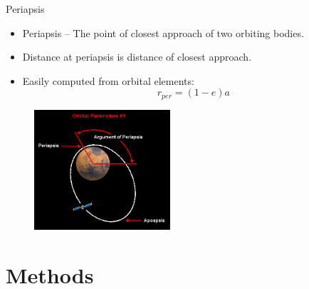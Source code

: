 \documentclass{beamer}
\begin{document}
\begin{frame}{Periapsis}
    \begin{itemize}
        \item Periapsis -- The point of closest approach of two orbiting bodies.
        \item Distance at periapsis is distance of closest approach.
        \item Easily computed from orbital elements:
            \begin{equation}
                r_{per} = (1 - e) a
            \end{equation}
    \end{itemize}
    \begin{figure}
        \centering
        \includegraphics[height=1.75in]{periapsis_diag}
    \end{figure}
\end{frame}

\section{Methods}
\end{document}
